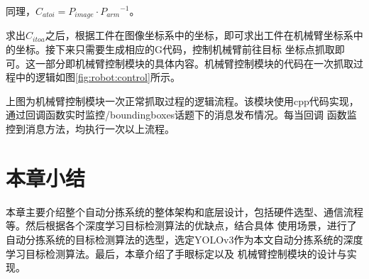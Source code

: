 同理，$C_{atoi} =  P_{image} \cdot {P_{arm}}^{-1}$。

求出$C_{itoa}$之后，根据工件在图像坐标系中的坐标，即可求出工件在机械臂坐标系中的坐标。接下来只需要生成相应的G代码，控制机械臂前往目标
坐标点抓取即可。这一部分即机械臂控制模块的具体内容。机械臂控制模块的代码在一次抓取过程中的逻辑如图\ref{fig:robot:control}所示。



上图为机械臂控制模块一次正常抓取过程的逻辑流程。该模块使用cpp代码实现，通过回调函数实时监控/boundingboxes话题下的消息发布情况。每当回调
函数监控到消息方法，均执行一次以上流程。

\section{本章小结}
本章主要介绍整个自动分拣系统的整体架构和底层设计，包括硬件选型、通信流程等。然后根据各个深度学习目标检测算法的优缺点，结合具体
使用场景，进行了自动分拣系统的目标检测算法的选型，选定YOLOv3作为本文自动分拣系统的深度学习目标检测算法。最后，本章介绍了手眼标定以及
机械臂控制模块的设计与实现。

